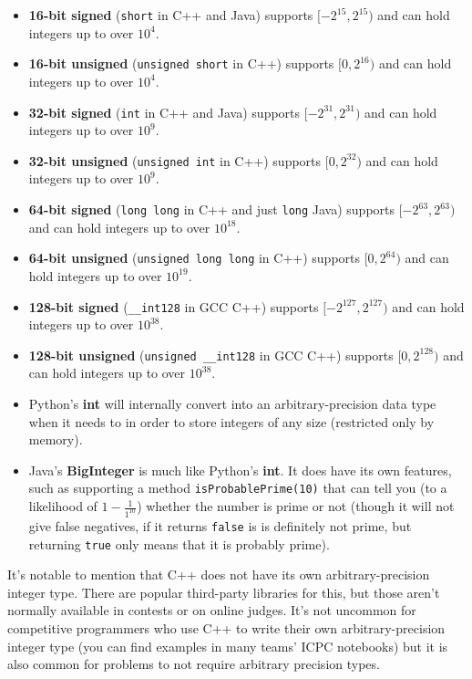 \begin{itemize}
\item \textbf{16-bit signed} (\texttt{short} in C++ and Java) supports $[-2^{15},2^{15})$ and can hold integers up to over $10^4$.
\item \textbf{16-bit unsigned} (\texttt{unsigned short} in C++) supports $[0,2^{16})$ and can hold integers up to over $10^4$.
\item \textbf{32-bit signed} (\texttt{int} in C++ and Java) supports $[-2^{31},2^{31})$ and can hold integers up to over $10^9$.
\item \textbf{32-bit unsigned} (\texttt{unsigned int} in C++) supports $[0,2^{32})$ and can hold integers up to over $10^9$.
\item \textbf{64-bit signed} (\texttt{long long} in C++ and just \texttt{long} Java) supports $[-2^{63},2^{63})$ and can hold integers up to over $10^{18}$.
\item \textbf{64-bit unsigned} (\texttt{unsigned long long} in C++) supports $[0,2^{64})$ and can hold integers up to over $10^{19}$.
\item \textbf{128-bit signed} (\texttt{__int128} in GCC C++) supports $[-2^{127},2^{127})$ and can hold integers up to over $10^{38}$.
\item \textbf{128-bit unsigned} (\texttt{unsigned __int128} in GCC C++) supports $[0,2^{128})$ and can hold integers up to over $10^{38}$.
\item Python's \textbf{int} will internally convert into an arbitrary-precision data type when it needs to in order to store integers of any size (restricted only by memory).
\item Java's \textbf{BigInteger} is much like Python's \textbf{int}. It does have its own features, such as supporting a method \texttt{isProbablePrime(10)} that can tell you (to a likelihood of $1 - \frac{1}{1^{10}}$) whether the number is prime or not (though it will not give false negatives, if it returns \texttt{false} is is definitely not prime, but returning \texttt{true} only means that it is probably prime).
\end{itemize}

It's notable to mention that C++ does not have its own arbitrary-precision integer type. There are popular third-party libraries for this, but those aren't normally available in contests or on online judges. It's not uncommon for competitive programmers who use C++ to write their own arbitrary-precision integer type (you can find examples in many teams' ICPC notebooks) but it is also common for problems to not require arbitrary precision types.

